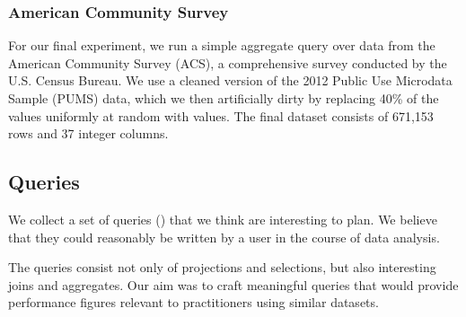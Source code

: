 \subsubsection{American Community Survey}
For our final experiment, we run a simple aggregate query over data from the American
Community Survey (ACS), a comprehensive survey conducted by the U.S.
Census Bureau. We use a cleaned version of the 2012 Public Use Microdata Sample (PUMS) data,
which we then artificially dirty by replacing 40\% of the values uniformly at random with
\nullv{} values.
The final dataset consists of 671,153 rows and 37 integer columns.

\subsection{Queries}
We collect a set of queries () that we think are interesting to plan.
We believe that they could reasonably be written by a user in the course of data analysis.

The queries consist not only of projections and selections, but also
interesting joins and aggregates. Our aim was to craft meaningful queries that would
provide performance figures relevant to practitioners using similar datasets.


%

